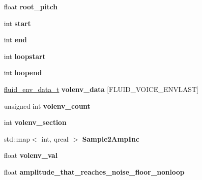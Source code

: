 \begin{DoxyCompactItemize}
\mbox{\label{class_fluid_s_1_1_voice_a6207d6cbbda463166f3b4f90f80709a0}} 
float {\bfseries root\+\_\+pitch}
\item 
\mbox{\label{class_fluid_s_1_1_voice_a9b9cba9d9ae8ab045b91eb0eba7058a1}} 
int {\bfseries start}
\item 
\mbox{\label{class_fluid_s_1_1_voice_acfde1281267ab38e410ec947ae1877a0}} 
int {\bfseries end}
\item 
\mbox{\label{class_fluid_s_1_1_voice_ae89139e48f9b6f416bdfedce83c182e1}} 
int {\bfseries loopstart}
\item 
\mbox{\label{class_fluid_s_1_1_voice_a3ce212d62e2f155fb1801f621fb251bb}} 
int {\bfseries loopend}
\item 
\mbox{\label{class_fluid_s_1_1_voice_a6bb0ea3d4e69c2487b28858fb9620fdf}} 
\hyperlink{struct_fluid_s_1_1fluid__env__data__t}{fluid\+\_\+env\+\_\+data\+\_\+t} {\bfseries volenv\+\_\+data} \mbox{[}F\+L\+U\+I\+D\+\_\+\+V\+O\+I\+C\+E\+\_\+\+E\+N\+V\+L\+A\+ST\mbox{]}
\item 
\mbox{\label{class_fluid_s_1_1_voice_a36966404dcefaf9c517986c46276233c}} 
unsigned int {\bfseries volenv\+\_\+count}
\item 
\mbox{\label{class_fluid_s_1_1_voice_a3fcc3f07a8734e263674ada3c878b8c8}} 
int {\bfseries volenv\+\_\+section}
\item 
\mbox{\label{class_fluid_s_1_1_voice_a1539163f35c51c5b373643ebef327f77}} 
std\+::map$<$ int, qreal $>$ {\bfseries Sample2\+Amp\+Inc}
\item 
\mbox{\label{class_fluid_s_1_1_voice_a95e5e7f1aa6004044ca3d0bee7821a92}} 
float {\bfseries volenv\+\_\+val}
\item 
\mbox{\label{class_fluid_s_1_1_voice_af77b321d64f87de27607f611990a1e46}} 
float {\bfseries amplitude\+\_\+that\+\_\+reaches\+\_\+noise\+\_\+floor\+\_\+nonloop}

\end{DoxyCompactItemize}
